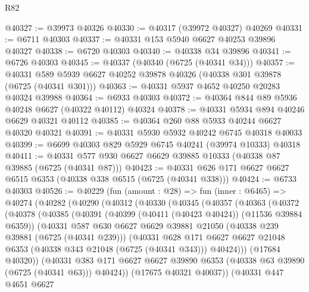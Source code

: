 \begin{lexlean}{R82}
\begin{coremodule}
@40327 := @39973 @40326
@40330 := @40317 (@39972 @40327) @40269
@40331 := @6711 @40303
@40337 := @40331 @153 @5940 @6627 @40253 @39896 @40327
@40338 := @6720 @40303
@40340 := @40338 @34 @39896
@40341 := @6726 @40303
@40345 := @40337 (@40340 (@6725 (@40341 @34)))
@40357 := @40331 @589 @5939 @6627 @40252 @39878 @40326 (@40338 @301 @39878 (@6725 (@40341 @301)))
@40363 := @40331 @5937 @4652 @40250 @20283 @40324 @39988
@40364 := @6933 @40303
@40372 := @40364 @844 @89 @5936 @40248 @6627 (@40322 @40112) @40324
@40378 := @40331 @5934 @894 @40246 @6629 @40321 @40112
@40385 := @40364 @260 @88 @5933 @40244 @6627 @40320 @40321
@40391 := @40331 @5930 @5932 @40242 @6745 @40318 @40033
@40399 := @6699 @40303 @829 @5929 @6745 @40241 (@39974 @10333) @40318
@40411 := @40331 @577 @930 @6627 @6629 @39885 @10333 (@40338 @87 @39885 (@6725 (@40341 @87)))
@40423 := @40331 @626 @171 @6627 @6627 @6515 @6353 (@40338 @338 @6515 (@6725 (@40341 @338)))
@40424 := @6733 @40303
@40526 := @40229
    (fun (amount : @28) =>
    fun (inner : @6465) =>
    @40274
      (@40282
        (@40290
          (@40312
            (@40330
              (@40345
                (@40357
                  (@40363
                    (@40372
                      (@40378
                        (@40385
                          (@40391
                            (@40399 (@40411 (@40423 @40424)) (@11536 @39884 @6359))
                            (@40331
                              @587
                              @630
                              @6627
                              @6629
                              @39881
                              @21050
                              (@40338 @239 @39881 (@6725 (@40341 @239)))
                              (@40331
                                @628
                                @171
                                @6627
                                @6627
                                @21048
                                @6353
                                (@40338 @343 @21048 (@6725 (@40341 @343)))
                                @40424)))
                          (@17684 @40320))
                        (@40331
                          @383
                          @171
                          @6627
                          @6627
                          @39890
                          @6353
                          (@40338 @63 @39890 (@6725 (@40341 @63)))
                          @40424))
                      (@17675 @40321 @40037))
                    (@40331
                      @447
                      @4651
                      @6627

\end{coremodule}
\end{lexlean}
